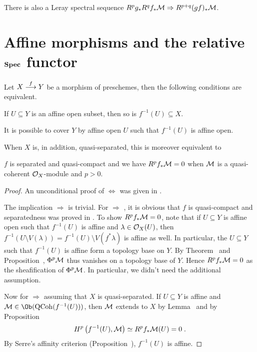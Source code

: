 \documentclass[a4paper,parskip=half,numbers=enddot, DIV=12]{scrreprt}
\begin{document}
There is also a Leray spectral sequence $R^pg_*R^qf_*\Mm\converge R^{p+q}(gf)_*\Mm$.

\section{Affine morphisms and the relative \texorpdfstring{$\operatorname{\mathbf{Spec}}$}{Spec} functor}
\begin{prop}
	Let $X\morphism[f]Y$ be a morphism of preschemes, then the following conditions are equivalent.
	\begin{alphanumerate}
		\item If $U\subseteq Y$ is an affine open subset, then so is $f^{-1}(U)\subseteq X$.
		\item It is possible to cover $Y$ by affine open $U$ such that $f^{-1}(U)$ is affine open.
	\end{alphanumerate}
	When $X$ is, in addition, quasi-separated, this is moreover equivalent to
	\begin{alphanumerate}\setcounter{enumi}{2}
		\item $f$ is separated and quasi-compact and we have $R^pf_*\mathcal{M}=0$ when $\mathcal{M}$ is a quasi-coherent $\mathcal{O}_X$-module and $p>0$.
	\end{alphanumerate}
\end{prop}
\begin{proof}
	An unconditional proof of  $\Leftrightarrow$  was given in \cite[Lemma~2.5.1]{alggeo1}.
	
	The implication  $\Rightarrow$  is trivial. For  $\Rightarrow$ , it is obvious that $f$ is quasi-compact and separatedness was proved in \cite[Fact~2.6.1]{alggeo1}. To show $R^pf_*\mathcal{M}=0$, note that if $U\subseteq Y$ is affine open such that $f^{-1}(U)$ is affine and $\lambda\in\mathcal{O}_X(U)$, then $f^{-1}(U\setminus V(\lambda))=f^{-1}(U)\setminus V(f^*\lambda)$ is affine as well. In particular, the $U\subseteq Y$ such that $f^{-1}(U)$ is affine form a topology base on $Y$.  By Theorem~ and Proposition~, $\Phi^p\mathcal{M}$ thus vanishes on a topology base of $Y$. Hence $R^pf_*\mathcal{M}=0$ as the sheafification of  $\Phi^p\mathcal{M}$. In particular, we didn't need the additional assumption.
	
	Now for  $\Rightarrow$  assuming that $X$ is quasi-separated. If $U\subseteq Y$ is affine and $\Mm\in\Ob(\cat{QCoh}(f^{-1}(U)))$, then $\mathcal{M}$ extends to $X$ by Lemma~ and by Proposition~
	\begin{align*}
		H^p\left(f^{-1}(U),\mathcal{M}\right)\simeq R^pf_*\mathcal{M}(U)=0\;.
	\end{align*}
	By Serre's affinity criterion (Proposition~), $f^{-1}(U)$ is affine.
\end{proof}
\end{document}

